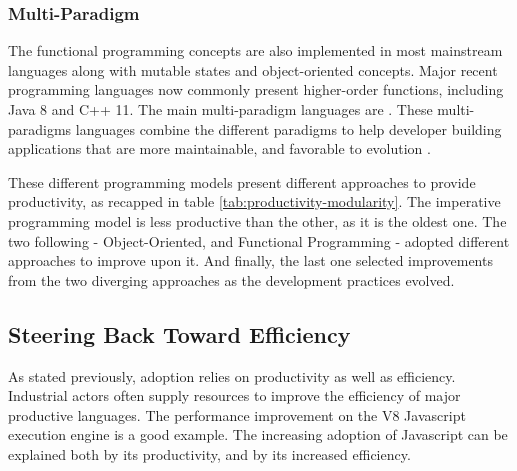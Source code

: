 \subsubsection{Multi-Paradigm}

The functional programming concepts are also implemented in most mainstream languages along with mutable states and object-oriented concepts.
Major recent programming languages now commonly present higher-order functions, including Java 8 and C++ 11.
The main multi-paradigm languages are .
These multi-paradigms languages combine the different paradigms to help developer building applications that are more maintainable, and favorable to evolution \cite{Hughes1989,Turner1981}.

\separator

These different programming models present different approaches to provide productivity, as recapped in table \ref{tab:productivity-modularity}.
The imperative programming model is less productive than the other, as it is the oldest one.
The two following - Object-Oriented, and Functional Programming - adopted different approaches to improve upon it.
And finally, the last one selected improvements from the two diverging approaches as the development practices evolved.


\subsection{Steering Back Toward Efficiency} \label{chapter3:software-productivity:adoption}

\begin{figure}
%
\end{figure}


As stated previously, adoption relies on productivity as well as efficiency.
Industrial actors often supply resources to improve the efficiency of major productive languages.
The performance improvement on the V8 Javascript execution engine is a good example.
The increasing adoption of Javascript can be explained both by its productivity, and by its increased efficiency.

